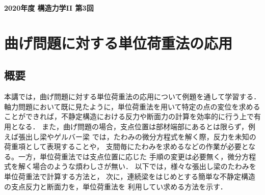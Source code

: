 \documentclass[10pt,a4j]{jarticle}
\newlength{\minitwocolumn}
\begin{document}
\newcommand{\fat}[1]{\mbox{\boldmath $#1$}}
\newcommand{\D}{\partial}
\newcommand{\w}{\omega}
\newcommand{\ga}{\alpha}
\newcommand{\gb}{\beta}
\newcommand{\gx}{\xi}
\newcommand{\gz}{\zeta}
\newcommand{\vhat}[1]{\hat{\fat{#1}}}
\newcommand{\spc}{\vspace{0.7\baselineskip}}
\newcommand{\halfspc}{\vspace{0.3\baselineskip}}

\newcommand{\twofig}[2]
 {
   \begin{figure}
     \begin{minipage}[t]{\minitwocolumn}
         \begin{center}   #1
         \end{center}
     \end{minipage}
         \hspace{\columnsep}
     \begin{minipage}[t]{\minitwocolumn}
         \begin{center} #2
         \end{center}
     \end{minipage}
   \end{figure}
 }
\begin{center}
	{\Large \bf 2020年度 構造力学II 第3回} \\
\end{center}
\setcounter{section}{2}
\section{曲げ問題に対する単位荷重法の応用}
\subsection{概要}
本講では，曲げ問題に対する単位荷重法の応用について例題を通して学習する．
軸力問題において既に見たように，単位荷重法を用いて特定の点の変位を求める
ことができれば，不静定構造における反力や断面力の計算を効率的に行う上で有用となる．
また，曲げ問題の場合，支点位置は部材端部にあるとは限らず，例えば張出し梁やゲルバー梁
では，たわみの微分方程式を解く際，反力を未知の荷重項として表現することや，
支間毎にたわみを求めるなどの作業が必要となる。一方，単位荷重法では支点位置に応じた
手順の変更は必要無く，微分方程式を解く場合のような煩わしさが無い．
以下では，様々な張出し梁のたわみを単位荷重法で計算する方法と，
次に，連続梁をはじめとする簡単な不静定構造の支点反力と断面力を，単位荷重法を
利用してい求める方法を示す．
\end{document}
